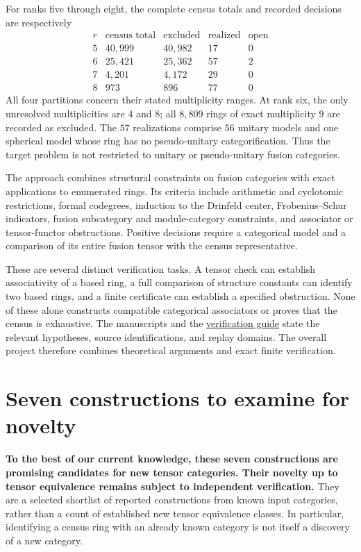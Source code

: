 \documentclass[11pt,a4paper]{article}
\newcommand{\snap}{https://github.com/sebastienpalcoux/grothendieck-ring-classification/blob/e34396cd95aff1090c10974dd934fe6054ca45eb}
\newcommand{\prooflink}[2]{\href{\snap/#1}{#2}}
\begin{document}
For ranks five through eight, the complete census totals and recorded
decisions are respectively
\[
\begin{array}{c|r|r|r|r}
 r & \text{census total} & \text{excluded} & \text{realized} & \text{open}\\\hline
5&40{,}999&40{,}982&17&0\\
6&25{,}421&25{,}362&57&2\\
7&4{,}201&4{,}172&29&0\\
8&973&896&77&0
\end{array}
\]
All four partitions concern their stated multiplicity ranges. At rank six,
the only unresolved multiplicities are $4$ and $8$; all $8{,}809$ rings
of exact multiplicity $9$ are recorded as excluded. The $57$ realizations
comprise $56$ unitary models and one spherical model whose ring has no
pseudo-unitary categorification. Thus the target problem is not restricted
to unitary or pseudo-unitary fusion categories.

The approach combines structural constraints on fusion categories with
exact applications to enumerated rings. Its criteria include arithmetic
and cyclotomic restrictions, formal codegrees, induction to the Drinfeld
center, Frobenius--Schur indicators, fusion subcategory and module-category
constraints, and associator or tensor-functor obstructions. Positive
decisions require a categorical model and a comparison of its entire
fusion tensor with the census representative.

These are several distinct verification tasks. A tensor check can establish
associativity of a based ring, a full comparison of structure constants can
identify two based rings, and a finite certificate can establish a specified
obstruction. None of these alone constructs compatible categorical
associators or proves that the census is exhaustive. The manuscripts and
the \prooflink{docs/VERIFY.md}{verification guide} state the relevant
hypotheses, source identifications, and replay domains. The overall project
therefore combines theoretical arguments and exact finite verification.

\section{Seven constructions to examine for novelty}
\textbf{To the best of our current knowledge, these seven constructions
are promising candidates for new tensor categories. Their novelty up to
tensor equivalence remains subject to independent verification.}
They are a selected shortlist of reported constructions from known input
categories, rather than a count of established new tensor equivalence
classes. In particular, identifying a census ring with an already known
category is not itself a discovery of a new category.
\end{document}
